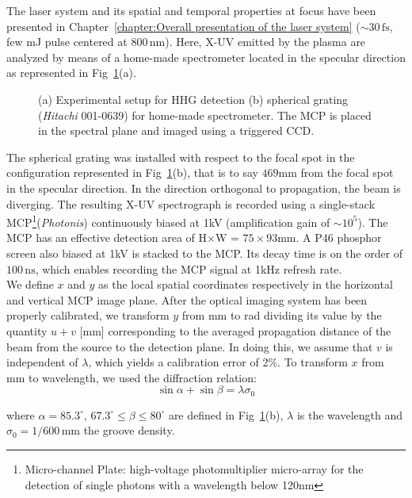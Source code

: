 The laser system and its spatial and temporal properties at focus have been presented in Chapter~\ref{chapter:Overall presentation of the laser system} ($\sim 30\,\mathrm{fs}$, few mJ pulse centered at $800\,\mathrm{nm}$).
Here, X-UV emitted by the plasma are analyzed by means of a home-made spectrometer located in the specular direction as represented in Fig~\ref{SETUP_hhg}(a). 

\begin{figure}[H]
\caption{\label{SETUP_hhg}(a) Experimental setup for HHG detection (b) spherical grating (\textit{Hitachi} 001-0639) for home-made spectrometer. The MCP is placed in the spectral plane and imaged using a triggered CCD.}
\end{figure}

\noindent The spherical grating was installed with respect to the focal spot in the configuration represented in Fig~\ref{SETUP_hhg}(b), that is to say $469$mm from the focal spot in the specular direction. In the direction orthogonal to propagation, the beam is diverging. The resulting X-UV spectrograph is recorded using a single-stack MCP\footnote{Micro-channel Plate: high-voltage photomultiplier micro-array for the detection of single photons with a wavelength below 120nm}(\textit{Photonis}) continuously biased at 1kV (amplification gain of $\sim 10^5$). The MCP has an effective detection area of H$\times$W = $75\times 93$mm. A P46 phosphor screen also biased at 1kV is stacked to the MCP. Its decay time is on the order of $100\,\mathrm{ns}$, which enables recording the MCP signal at 1kHz refresh rate.\\

\noindent We define $x$ and $y$ as the local spatial coordinates respectively in the horizontal and vertical MCP image plane. After the optical imaging system has been properly calibrated, we transform $y$ from mm to rad dividing its value by the quantity $u +v$ [mm] corresponding to the averaged propagation distance of the beam from the source to the detection plane. In doing this, we assume that $v$ is independent of $\lambda$, which yields a calibration error of 2\%. To transform $x$ from mm to wavelength, we used the diffraction relation:
$$
\sin \alpha + \sin \beta = \lambda \sigma_0
$$

\noindent where $\alpha =85.3^{\circ}$, $67.3^{\circ} \le \beta \le 80^{\circ}$ are defined in Fig~\ref{SETUP_hhg}(b), $\lambda$ is the wavelength and $\sigma_0 = 1/600\,\mathrm{mm}$ the  groove density.\\

